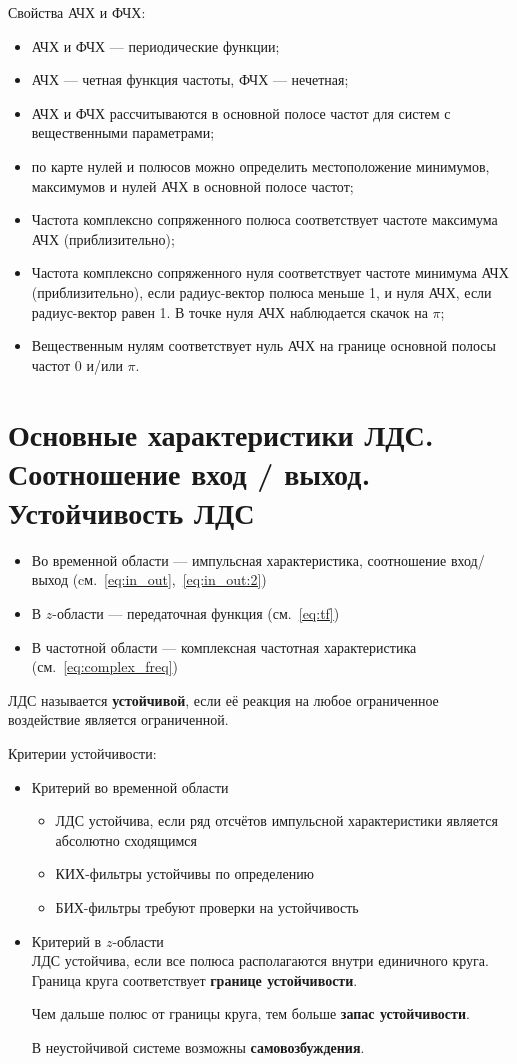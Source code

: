 \documentclass[a4paper, 14pt]{extarticle}
\begin{document}
Свойства АЧХ и ФЧХ:
\begin{itemize}
    \item АЧХ и ФЧХ --- периодические функции;
    \item АЧХ --- четная функция частоты, ФЧХ --- нечетная;
    \item АЧХ и ФЧХ рассчитываются в основной полосе частот для систем с вещественными параметрами;
    \item по карте нулей и полюсов можно определить местоположение минимумов, максимумов и нулей АЧХ в основной полосе частот;
    \item Частота комплексно сопряженного полюса соответствует частоте максимума АЧХ (приблизительно);
    \item Частота комплексно сопряженного нуля соответствует частоте минимума АЧХ (приблизительно), если радиус-вектор полюса меньше 1, и нуля АЧХ, если радиус-вектор равен 1. В точке нуля АЧХ наблюдается скачок на $\pi$;
    \item Вещественным нулям соответствует нуль АЧХ на границе основной полосы частот $0$ и/или $\pi$.
\end{itemize}

\section{Основные характеристики ЛДС. Соотношение вход / выход. Устойчивость ЛДС}
\begin{itemize}
    \item Во временной области --- импульсная характеристика, соотношение вход/выход (cм.~\ref{eq:in_out},~\ref{eq:in_out:2})
    \item В $z$-области --- передаточная функция (см.~\ref{eq:tf})
    \item В частотной области --- комплексная частотная характеристика (см.~\ref{eq:complex_freq})
\end{itemize}

ЛДС называется \textbf{устойчивой}, если её реакция на любое ограниченное воздействие является ограниченной.

Критерии устойчивости:
\begin{itemize}
    \item Критерий во временной области
    \begin{itemize}
        \item ЛДС устойчива, если ряд отсчётов импульсной характеристики является абсолютно сходящимся
        \item КИХ-фильтры устойчивы по определению
        \item БИХ-фильтры требуют проверки на устойчивость
    \end{itemize}
    \item Критерий в $z$-области\\
        ЛДС устойчива, если все полюса располагаются внутри единичного круга. Граница круга соответствует \textbf{границе устойчивости}.

        Чем дальше полюс от границы круга, тем больше \textbf{запас устойчивости}.

        В неустойчивой системе возможны \textbf{самовозбуждения}.
\end{itemize}
\end{document}
